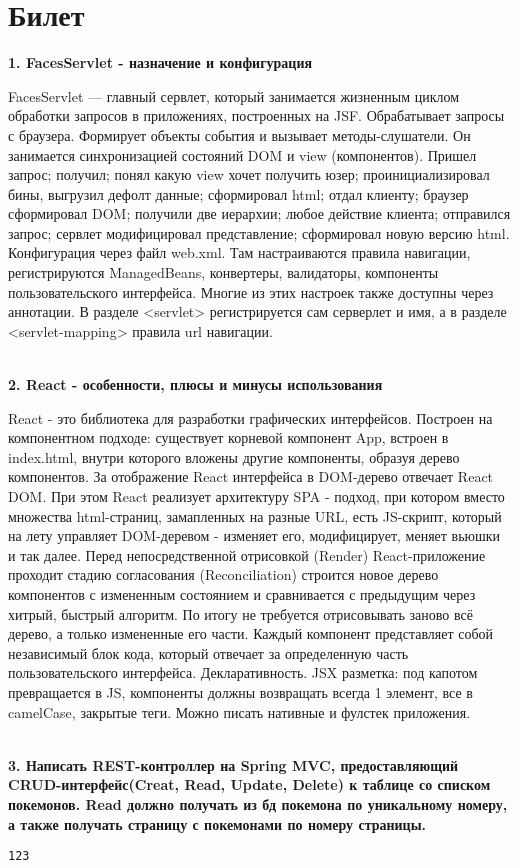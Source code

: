 \documentclass{article}
\newcommand{\bil}[5]{%
        \section{Билет}
        \textbf{1. #1}

        #4
        \\
        \textbf{2. #2}
        
        #5
        \\
        \textbf{3. #3}
}
\begin{document}
\bil{FacesServlet - назначение и конфигурация}
{React - особенности, плюсы и минусы использования}
{Написать REST-контроллер на Spring MVC, предоставляющий  CRUD-интерфейс(Creat, Read, Update, Delete) к таблице со списком покемонов. Read должно получать из бд покемона по уникальному номеру, а также получать страницу с покемонами по номеру страницы.}{
    FacesServlet — главный сервлет, который занимается жизненным циклом обработки запросов в приложениях, построенных на JSF. Обрабатывает запросы с браузера. 
    Формирует объекты события и вызывает методы-слушатели. 
    Он занимается синхронизацией состояний DOM и view (компонентов). Пришел запрос; получил; понял какую view хочет получить юзер; проинициализировал бины, выгрузил дефолт данные; сформировал html; отдал клиенту; браузер сформировал DOM; получили две иерархии; любое действие клиента; отправился запрос; сервлет модифицировал представление; сформировал новую версию html.
    Конфигурация через файл web.xml. 
    Там настраиваются правила навигации, регистрируются ManagedBeans, конвертеры, валидаторы, компоненты пользовательского интерфейса. 
    Многие из этих настроек также доступны через аннотации. 
    В разделе <servlet> регистрируется сам серверлет и имя, а в разделе <servlet-mapping> правила url навигации.
}{
    React - это библиотека для разработки графических интерфейсов. 
    Построен на компонентном подходе: существует корневой компонент App, встроен в index.html, внутри которого вложены другие компоненты, образуя дерево компонентов. 
    За отображение React интерфейса в DOM-дерево отвечает React DOM. 
    При этом React реализует архитектуру SPA - подход, при котором вместо множества html-страниц, замапленных на разные URL, есть JS-скрипт, который на лету управляет DOM-деревом - изменяет его, модифицирует, меняет вьюшки и так далее. 
    Перед непосредственной отрисовкой (Render) React-приложение проходит стадию согласования (Reconciliation) строится новое дерево компонентов с измененным состоянием и сравнивается с предыдущим через хитрый, быстрый алгоритм. 
    По итогу не требуется отрисовывать заново всё дерево, а только измененные его части.
    Каждый компонент представляет собой независимый блок кода, который отвечает за определенную часть пользовательского интерфейса.
    Декларативность.
    JSX разметка: под капотом превращается в JS, компоненты должны возвращать всегда 1 элемент, все в camelCase, закрытые теги.
    Можно писать нативные и фулстек приложения.
}
\begin{lstlisting}[frame=single, basicstyle=\ttfamily, breaklines=true, breakatwhitespace=true, postbreak=\mbox{\textcolor{red}{$\hookrightarrow$}\space}]
123
\end{lstlisting}
\end{document}
